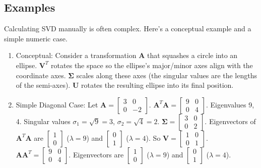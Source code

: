 \documentclass{article}
\newcommand{\mat}[1]{\bm{#1}}  %
\begin{document}
\subsection*{Examples}
Calculating SVD manually is often complex. Here's a conceptual example and a simple numeric case.
\begin{enumerate}
    \item Conceptual: Consider a transformation $\mat{A}$ that squashes a circle into an ellipse. $\mat{V}^T$ rotates the space so the ellipse's major/minor axes align with the coordinate axes. $\mat{\Sigma}$ scales along these axes (the singular values are the lengths of the semi-axes). $\mat{U}$ rotates the resulting ellipse into its final position.

    \item Simple Diagonal Case: Let $\mat{A} = \begin{bmatrix} 3 & 0 \\ 0 & -2 \end{bmatrix}$.
    $\mat{A}^T\mat{A} = \begin{bmatrix} 9 & 0 \\ 0 & 4 \end{bmatrix}$. Eigenvalues 9, 4. Singular values $\sigma_1 = \sqrt{9}=3$, $\sigma_2 = \sqrt{4}=2$. $\mat{\Sigma} = \begin{bmatrix} 3 & 0 \\ 0 & 2 \end{bmatrix}$.
    Eigenvectors of $\mat{A}^T\mat{A}$ are $\begin{bmatrix} 1 \\ 0 \end{bmatrix}$ ($\lambda=9$) and $\begin{bmatrix} 0 \\ 1 \end{bmatrix}$ ($\lambda=4$). So $\mat{V} = \begin{bmatrix} 1 & 0 \\ 0 & 1 \end{bmatrix}$.
    $\mat{A}\mat{A}^T = \begin{bmatrix} 9 & 0 \\ 0 & 4 \end{bmatrix}$. Eigenvectors are $\begin{bmatrix} 1 \\ 0 \end{bmatrix}$ ($\lambda=9$) and $\begin{bmatrix} 0 \\ 1 \end{bmatrix}$ ($\lambda=4$).

\end{enumerate}
\end{document}
